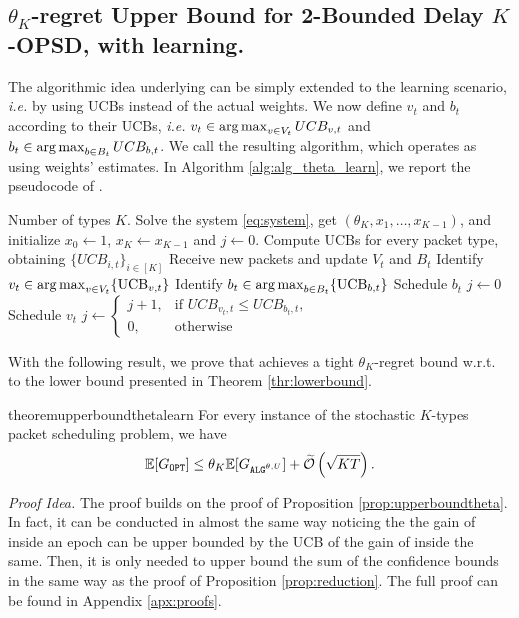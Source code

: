 \subsection{$\theta_K$-regret Upper Bound for 2-Bounded Delay $K$-OPSD, with learning.} The algorithmic idea underlying \algtheta can be simply extended to the learning scenario, \emph{i.e.} by using UCBs instead of the actual weights. 
We now define $v_t$ and $b_t$ according to their UCBs, \emph{i.e.} $v_t \in \operatorname*{arg\,max}_{v \in V_t} UCB_{v,t}$ and $b_t \in \operatorname*{arg\,max}_{b \in B_t} UCB_{b,t}$. 
We call \algthetalearn the resulting algorithm, which operates as \algtheta using weights' estimates. In Algorithm \ref{alg:alg_theta_learn}, we report the pseudocode of \algthetalearn.
\begin{algorithm}[t!]
\caption{\algthetalearn}
\label{alg:alg_theta_learn}
\small
\begin{algorithmic}[1]
    \REQUIRE Number of types $K$.
    \STATE Solve the system \eqref{eq:system}, get $(\theta_K, x_1, \ldots, x_{K - 1})$, and initialize $x_0 \leftarrow 1$, $x_K \gets x_{K-1}$ and $j \leftarrow 0$.
        \STATE Compute UCBs for every packet type, obtaining $\{UCB_{i,t}\}_{i\in [K]}$
    \ENDIF
        \STATE Receive new packets and update $V_t$ and $B_t$
        \STATE Identify $v_t \in \operatorname*{arg\,max}_{v \in V_t}\{\mathrm{UCB}_{v,t}\}$ 
        \STATE Identify $b_t \in \operatorname*{arg\,max}_{b \in B_t} \{\mathrm{UCB}_{b,t}\}$
            \STATE Schedule $b_t$
            \STATE $j \leftarrow 0$ 
        \ELSE
            \STATE Schedule $v_t$
            \STATE $j \leftarrow 
            \begin{cases}
              j+1, & \text{if } UCB_{v_t,t}\le UCB_{b_t,t},\\
              0, & \text{otherwise}
            \end{cases}$
        \ENDIF
    \ENDFOR
\end{algorithmic}
\end{algorithm}

With the following result, we prove that \algthetalearn achieves a tight $\theta_K$-regret bound w.r.t. to the lower bound presented in Theorem \ref{thr:lowerbound}.
\begin{restatable}{theorem}{upperboundthetalearn}
\label{thr:upperbound_thetalearn}
For every instance of the stochastic $K$-types packet scheduling problem, we have
    $$
    \mathbb{E}[\Gopt] \le \theta_K \mathbb{E}[\Galgthetalearn] + \widetilde{\mathcal{O}}\left(\sqrt{KT}\right).
    $$
\end{restatable}
\textit{Proof Idea.} The proof builds on the proof of Proposition \ref{prop:upperboundtheta}. In fact, it can be conducted in almost the same way noticing the the gain of \opt inside an epoch can be upper bounded by the UCB of the gain of \alg inside the same. Then, it is only needed to upper bound the sum of the confidence bounds in the same way as the proof of Proposition \ref{prop:reduction}. The full proof can be found in Appendix \ref{apx:proofs}.

